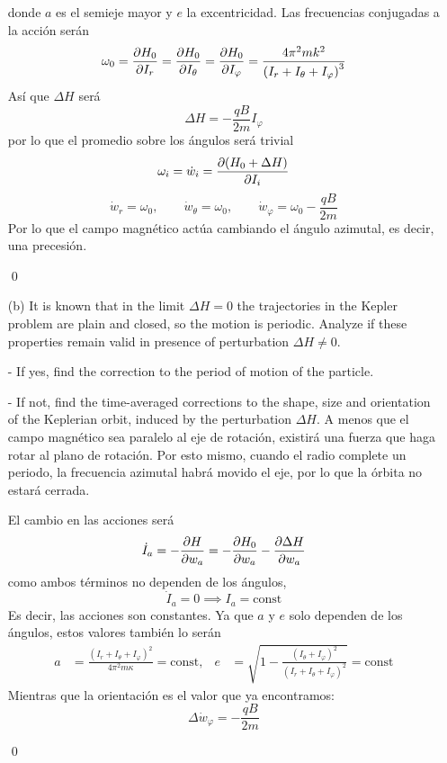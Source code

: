 \documentclass[]{article}
\numberwithin{equation}{section}
\begin{document}
\begin{enumerate}
	donde $a$ es el semieje mayor y $e$ la excentricidad. Las frecuencias conjugadas a la acción serán
	\begin{equation}
		\omega_0 = \pd{H_0}{I_r} = \pd{H_0}{I_\theta}  = \pd{H_0}{I_\varphi} =  \frac{4\pi^2 m k^2}{\left(I_r + I_\theta + I_\varphi\right)^3}
	\end{equation}
	Así que $\Delta H$ será
	\begin{equation}
		\Delta H = - \frac{q B}{2m} I_\varphi
	\end{equation}
	por lo que el promedio sobre los ángulos será trivial
	\begin{equation}
		\omega_i = \dot{w}_i = \pd{(H_0 + \Delta H)}{I_i}
	\end{equation}
	\begin{equation}
		\dot{w}_r = \omega_0, \qquad \dot{w}_\theta = \omega_0, \qquad \dot{w}_\varphi = \omega_0 - \frac{q B}{2m} 
	\end{equation}
	Por lo que el campo magnético actúa cambiando el ángulo azimutal, es decir, una precesión.
	
	\qed
	
	\item[(b)] It is known that in the limit $\Delta H = 0$ the trajectories in the Kepler problem are plain and closed, so the motion is periodic. Analyze if these properties remain valid in presence of perturbation $\Delta H \neq 0$.
	
	- If yes, find the correction to the period of motion of the particle.
	
	- If not, find the time-averaged corrections to the shape, size and orientation of the Keplerian orbit, induced by the perturbation $\Delta H$.
	\resp A menos que el campo magnético sea paralelo al eje de rotación, existirá una fuerza que haga rotar al plano de rotación. Por esto mismo, cuando el radio complete un periodo, la frecuencia azimutal habrá movido el eje, por lo que la órbita no estará cerrada.
	
	El cambio en las acciones será
	\begin{equation}
		\dot{I}_a = - \dfrac{\partial H}{\partial w_a} = - \dfrac{\partial H_0}{\partial w_a} - \dfrac{\partial \Delta H}{\partial w_a}
	\end{equation}
	como ambos términos no dependen de los ángulos,
	\begin{equation}
		\dot{I}_a = 0 \implies I_a = \mathrm{const}
	\end{equation}
	Es decir, las acciones son constantes. Ya que $a$ y $e$ solo dependen de los ángulos, estos valores también lo serán
	\begin{align*}
		a &= \frac{\left(I_r + I_\theta + I_\varphi\right)^2}{4\pi^2 m\kappa} = \mathrm{const}, & e &= \sqrt{1 - \frac{\left(I_\theta + I_\varphi\right)^2}{\left(I_r + I_\theta + I_\varphi\right)^2}} = \mathrm{const}
	\end{align*}
	Mientras que la orientación es el valor que ya encontramos:
	\begin{equation}
		\Delta\dot{w}_\varphi = - \frac{q B}{2m} 
	\end{equation}
	
	\qed
	

\end{enumerate}
\end{document}
